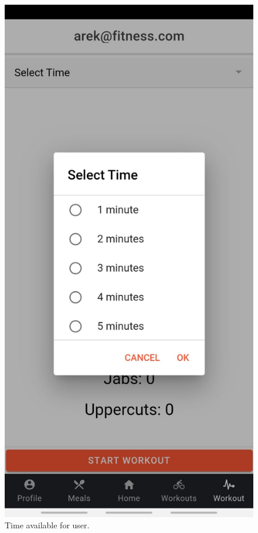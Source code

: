 \documentclass[a4paper,12pt]{report}
\begin{document}
\begin{figure}[ht]
\begin{minipage}[b]{0.5\linewidth}
    \includegraphics[width=.7\linewidth]{images/aplicationImages/timeSelection.jpeg} 
    \caption{Time available for user.} 
    \vspace{4ex}
  \end{minipage} 
  \begin{minipage}[b]{0.5\linewidth}
    \centering

\end{minipage}
\end{figure}
\end{document}
